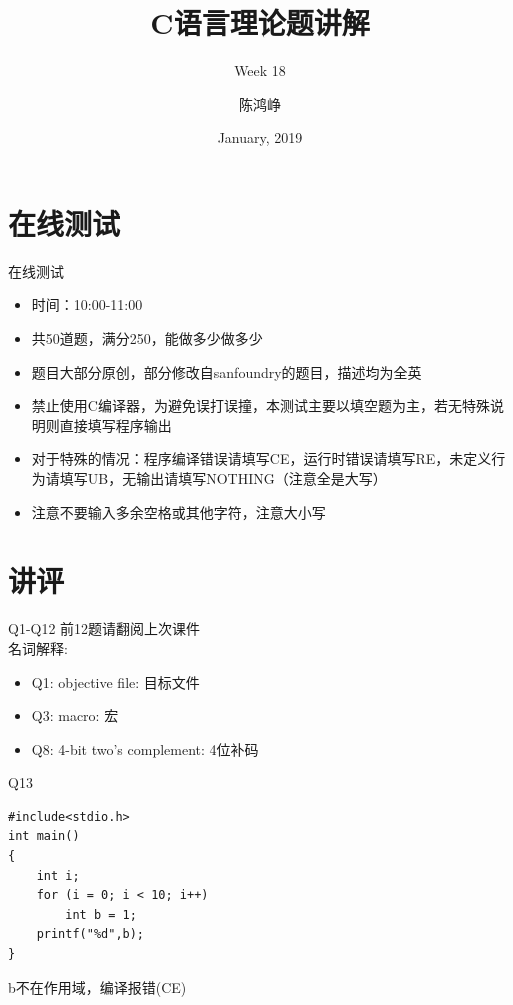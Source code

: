\documentclass[UTF8]{ctexbeamer}
\title{C语言理论题讲解}
\subtitle{Week 18}
\author[chhzh123]{陈鸿峥}
\date[Jan, 2019]{January, 2019}
\begin{document}
\begin{frame}
\titlepage
\end{frame}

\begin{frame}
\tableofcontents[subsectionstyle=show]
\end{frame}

\section{在线测试}
\begin{frame}
\sectionpage
\end{frame}

\begin{frame}{在线测试}
\begin{itemize}
	\item 时间：10:00-11:00
	\item 共50道题，满分250，能做多少做多少
	\item 题目大部分原创，部分修改自sanfoundry的题目，描述均为全英
	\item 禁止使用C编译器，为避免误打误撞，本测试主要以填空题为主，若无特殊说明则直接填写程序输出
	\item 对于特殊的情况：程序编译错误请填写CE，运行时错误请填写RE，未定义行为请填写UB，无输出请填写NOTHING（注意全是大写）
	\item 注意不要输入多余空格或其他字符，注意大小写
\end{itemize}
\end{frame}

\section{讲评}
\begin{frame}
\sectionpage
\end{frame}

\begin{frame}{Q1-Q12}
前12题请翻阅上次课件\\
名词解释:
\begin{itemize}
	\item Q1: objective file: 目标文件
	\item Q3: macro: 宏
	\item Q8: 4-bit two's complement: 4位补码
\end{itemize}
\end{frame}

\begin{frame}[fragile]{Q13}
\begin{lstlisting}
#include<stdio.h>
int main()
{
    int i;
    for (i = 0; i < 10; i++)
        int b = 1;
    printf("%d",b);
}
\end{lstlisting}
b不在作用域，编译报错(CE)
\end{frame}
\end{document}
